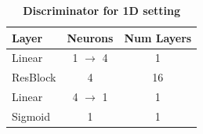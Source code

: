 

\begin{table}[ht]
\caption{\textbf{Discriminator for 1D setting}} %
\centering %
\begin{tabular}{l c c}
\toprule
\textbf{Layer} & \textbf{Neurons} & \textbf{Num Layers} \\ \midrule
Linear & 1 $\rightarrow$ 4 & 1  \\ %
ResBlock & 4 & 16 \\ 
Linear & 4 $\rightarrow$ 1 & 1 \\
Sigmoid & 1 & 1 \\
\bottomrule %
\end{tabular}
\label{table:1d_D} %
\end{table}


